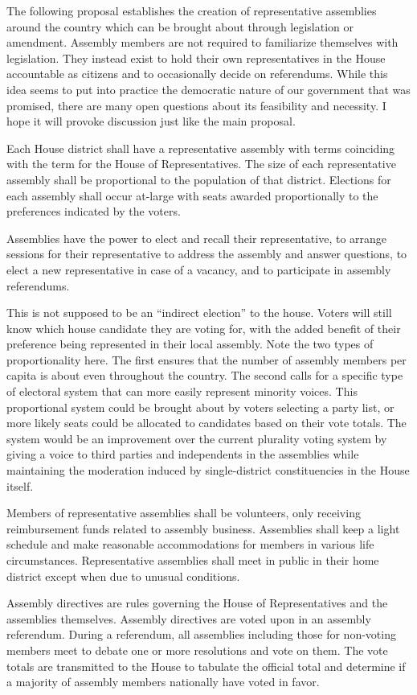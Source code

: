 \documentclass{article}
\newcommand{\quotes}[1]{``#1''}
\begin{document}
The following proposal establishes the creation of representative assemblies around the country which can be brought about through legislation or amendment. Assembly members are not required to familiarize themselves with legislation. They instead exist to hold their own representatives in the House accountable as citizens and to occasionally decide on referendums. While this idea seems to put into practice the democratic nature of our government that was promised, there are many open questions about its feasibility and necessity. I hope it will provoke discussion just like the main proposal.

\begin{quoting}
Each House district shall have a representative assembly with terms coinciding with the term for the House of Representatives. The size of each representative assembly shall be proportional to the population of that district. Elections for each assembly shall occur at-large with seats awarded proportionally to the preferences indicated by the voters.

Assemblies have the power to elect and recall their representative, to arrange sessions for their representative to address the assembly and answer questions, to elect a new representative in case of a vacancy, and to participate in assembly referendums.
\end{quoting}

This is not supposed to be an \quotes{indirect election} to the house. Voters will still know which house candidate they are voting for, with the added benefit of their preference being represented in their local assembly. Note the two types of proportionality here. The first ensures that the number of assembly members per capita is about even throughout the country. The second calls for a specific type of electoral system that can more easily represent minority voices. This proportional system could be brought about by voters selecting a party list, or more likely seats could be allocated to candidates based on their vote totals. The system would be an improvement over the current plurality voting system by giving a voice to third parties and independents in the assemblies while maintaining the moderation induced by single-district constituencies in the House itself.

\begin{quoting}
Members of representative assemblies shall be volunteers, only receiving reimbursement funds related to assembly business. Assemblies shall keep a light schedule and make reasonable accommodations for members in various life circumstances. Representative assemblies shall meet in public in their home district except when due to unusual conditions.

Assembly directives are rules governing the House of Representatives and the assemblies themselves. Assembly directives are voted upon in an assembly referendum. During a referendum, all assemblies including those for non-voting members meet to debate one or more resolutions and vote on them. The vote totals are transmitted to the House to tabulate the official total and determine if a majority of assembly members nationally have voted in favor.
\end{quoting}
\end{document}
